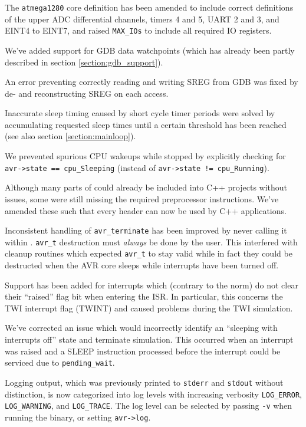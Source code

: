 The \verb|atmega1280| core definition has been amended to include correct
definitions of the upper \ac{ADC}
differential channels, timers 4 and 5, \ac{UART} 2 and 3, and EINT4 to EINT7, and raised
\lstinline|MAX_IOs| to include all required \ac{IO} registers.

We've added support for \ac{GDB} data watchpoints (which has already been
partly described in section \ref{section:gdb_support}).

An error preventing correctly reading and writing \ac{SREG} from \ac{GDB} was fixed
by de- and reconstructing \ac{SREG} on each access.

Inaccurate sleep timing caused by short cycle timer periods were solved by
accumulating requested sleep times until a certain threshold has been reached
(see also section \ref{section:mainloop}).

We prevented spurious \ac{CPU} wakeups while stopped by explicitly checking for
\lstinline|avr->state == cpu_Sleeping|
(instead of \lstinline|avr->state != cpu_Running|).

Although many parts of \simavr could already be included into C++ projects
without issues, some were still missing the required preprocessor instructions.
We've amended these such that every header can now be used by C++ applications.

Inconsistent handling of \lstinline|avr_terminate| has been improved by never
calling it within \simavr. \lstinline|avr_t| destruction must \emph{always}
be done by the user. This interfered with cleanup routines which expected
\lstinline|avr_t| to stay valid while in fact they could be destructed when
the \ac{AVR} core sleeps while interrupts have been turned off.

Support has been added for interrupts which (contrary to the norm) do not clear
their ``raised'' flag bit when entering the \ac{ISR}. In particular, this
concerns the \ac{TWI} interrupt flag (TWINT) and caused problems during the
\ac{TWI} simulation.

We've corrected an issue which would incorrectly identify an ``sleeping with
interrupts off'' state and terminate simulation. This occurred when an interrupt
was raised and a SLEEP instruction processed before the interrupt could be
serviced due to \lstinline|pending_wait|.

Logging output, which was previously printed to \lstinline|stderr| and
\lstinline|stdout| without distinction, is now categorized into log levels with
increasing verbosity \lstinline|LOG_ERROR|, \lstinline|LOG_WARNING|, and
\lstinline|LOG_TRACE|. The log level can be selected by passing \verb|-v|
when running the \simavr binary, or setting \lstinline|avr->log|.

